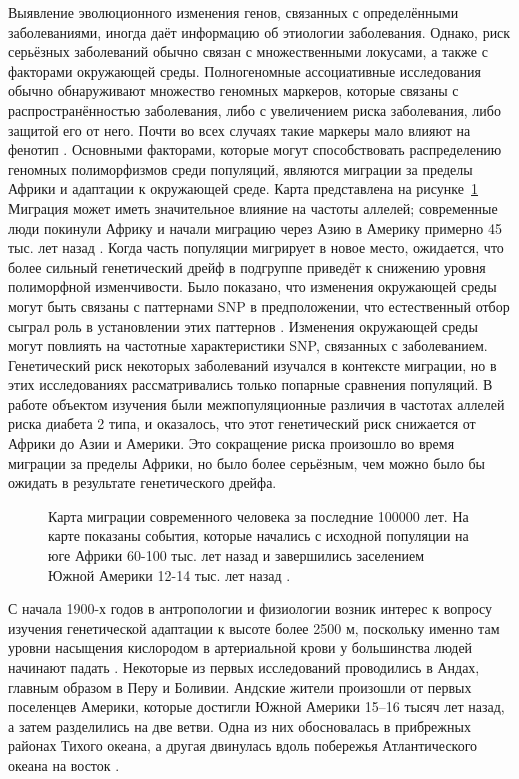 Выявление эволюционного изменения генов, связанных с определёнными заболеваниями, иногда даёт информацию об этиологии заболевания. Однако, риск серьёзных заболеваний обычно связан с множественными локусами, а также с факторами окружающей среды. Полногеномные ассоциативные исследования обычно обнаруживают множество геномных маркеров, которые связаны с распространённостью заболевания, либо с увеличением риска заболевания, либо защитой его от него. Почти во всех случаях такие маркеры мало влияют на фенотип \autocite{Blair2015}. Основными факторами, которые могут способствовать распределению геномных полиморфизмов среди популяций, являются миграции за пределы Африки и адаптации к окружающей среде. Карта представлена на рисунке~\cref{fig:map} Миграция может иметь значительное влияние на частоты аллелей; современные люди покинули Африку и начали миграцию через Азию в Америку примерно 45 тыс. лет назад \autocite{Henn2011, Henn2012}. Когда часть популяции мигрирует в новое место, ожидается, что более сильный генетический дрейф в подгруппе приведёт к снижению уровня полиморфной изменчивости. Было показано, что изменения окружающей среды могут быть связаны с паттернами SNP в предположении, что естественный отбор сыграл роль в установлении этих паттернов \autocite{Hancock2011adaptations}. Изменения окружающей среды могут повлиять на частотные характеристики SNP, связанных с заболеванием. Генетический риск некоторых заболеваний изучался в контексте миграции, но в этих исследованиях рассматривались только попарные сравнения популяций. В работе \autocite{Chen2012} объектом изучения были межпопуляционные различия в частотах аллелей риска диабета 2 типа, и оказалось, что этот генетический риск снижается от Африки до Азии и Америки. Это сокращение риска произошло во время миграции за пределы Африки, но было более серьёзным, чем можно было бы ожидать в результате генетического дрейфа. 

\begin{figure}[ht]
	\caption{Карта миграции современного человека за последние 100000 лет. На карте показаны события, которые начались с исходной популяции на юге Африки 60-100 тыс. лет назад и завершились заселением Южной Америки 12-14 тыс. лет назад \autocite{Henn2012}.}\label{fig:map}
\end{figure}

С начала 1900-х годов в антропологии и физиологии возник интерес к вопросу изучения генетической адаптации к высоте более 2500 м, поскольку именно там уровни насыщения кислородом в артериальной крови у большинства людей начинают падать \autocite{Julian2019}. Некоторые из первых исследований проводились в Андах, главным образом в Перу и Боливии. Андские жители произошли от первых поселенцев Америки, которые достигли Южной Америки 15--16 тысяч лет назад, а затем разделились на две ветви. Одна из них обосновалась в прибрежных районах Тихого океана, а другая двинулась вдоль побережья Атлантического океана на восток \autocite{GomezCarballa2018}. 

